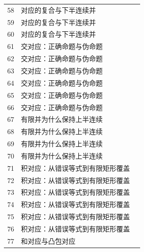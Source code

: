 \begin{longtable}{r p{.66\linewidth} r}
58 & 对应的复合与下半连续并 & \pageref{g:108:55}\\

59 & 对应的复合与下半连续并 & \pageref{g:108:55}\\

60 & 对应的复合与下半连续并 & \pageref{g:108:55}\\

61 & 交对应：正确命题与伪命题 & \pageref{g:108:61}\\

62 & 交对应：正确命题与伪命题 & \pageref{g:108:61}\\

63 & 交对应：正确命题与伪命题 & \pageref{g:108:61}\\

64 & 交对应：正确命题与伪命题 & \pageref{g:108:61}\\

65 & 交对应：正确命题与伪命题 & \pageref{g:108:61}\\

66 & 交对应：正确命题与伪命题 & \pageref{g:108:61}\\

67 & 有限并为什么保持上半连续 & \pageref{g:108:67}\\

68 & 有限并为什么保持上半连续 & \pageref{g:108:67}\\

69 & 有限并为什么保持上半连续 & \pageref{g:108:67}\\

70 & 有限并为什么保持上半连续 & \pageref{g:108:67}\\

71 & 积对应：从错误等式到有限矩形覆盖 & \pageref{g:108:71}\\

72 & 积对应：从错误等式到有限矩形覆盖 & \pageref{g:108:71}\\

73 & 积对应：从错误等式到有限矩形覆盖 & \pageref{g:108:71}\\

74 & 积对应：从错误等式到有限矩形覆盖 & \pageref{g:108:71}\\

75 & 积对应：从错误等式到有限矩形覆盖 & \pageref{g:108:71}\\

76 & 积对应：从错误等式到有限矩形覆盖 & \pageref{g:108:71}\\

77 & 和对应与凸包对应 & \pageref{g:108:77}\\


\end{longtable}
